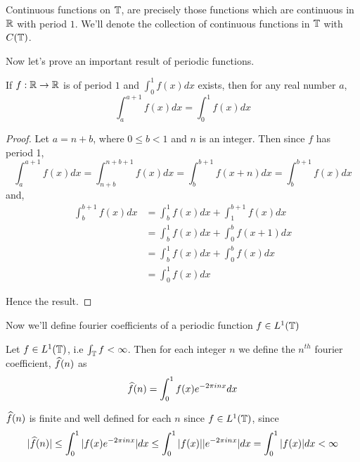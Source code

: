  \begin{definition}
    \label{def:continuous_functions_on_T}
    Continuous functions on $\mathbb T$, are precisely those functions which are continuous in $\mathbb R$ with period $1$. We'll denote the collection of continuous functions in $\mathbb T$ with $C(\mathbb T)$.
  \end{definition}

  Now let's prove an important result of periodic functions.
  \begin{lemma}
    \label{lem:integral_of_periodic_function}
    If $f:\mathbb R \to \mathbb R$ is of period $1$ and $\int_{0}^{1} f(x) dx$ exists, then for any real number $a$, 
    \begin{displaymath}
      \int_{a}^{a+1}f(x) dx = \int_{0}^{1} f(x) dx
    \end{displaymath} 
  \end{lemma}
  \begin{proof}
    Let $a = n +b$, where $0\le b <1$ and $n$ is an integer. Then since $f$ has period 1,
    \begin{displaymath}
      \int_{a}^{a+1}f(x) dx = \int_{n+b}^{n+b+1}f(x)dx = \int_{b}^{b+1}f(x+n)dx = \int_{b}^{b+1}f(x)dx
    \end{displaymath}
    and, 
    \begin{align*}
      \int_{b}^{b+1}f(x)dx &= \int_{b}^{1}f(x)dx + \int_{1}^{b+1}f(x)dx \\
                      &= \int_{b}^{1}f(x)dx + \int_{0}^{b}f(x+1)dx \\
                      &= \int_{b}^{1}f(x)dx + \int_{0}^{b}f(x)dx \\
                      &= \int_{0}^{1}f(x)dx
    \end{align*}

    Hence the result.
    
  \end{proof}

  Now we'll define fourier coefficients of a periodic function $f \in L^1(\mathbb T)$
  \begin{definition}
    \label{def:fourier_coefficient}
    Let $f \in L^1(\mathbb T)$, i.e $\int_{\mathbb T} f < \infty$. Then for each integer $n$ we define the $n^{th}$ fourier coefficient, $\widehat{f}(n)$ as 
    \begin{displaymath}
      \widehat{f}(n) = \int_0^1 f(x)e^{-2\pi inx} dx \end{displaymath}
  \end{definition}
  $\widehat{f}(n)$ is finite and well defined for each $n$ since $f \in L^1(\mathbb T)$, since
  \begin{displaymath}
    |\widehat{f}(n)| \le \int_0^1 |f(x)e^{-2\pi inx}| dx \le \int_0^1 |f(x)||e^{-2\pi inx}| dx = \int_0^1|f(x)| dx < \infty
  \end{displaymath}
  
